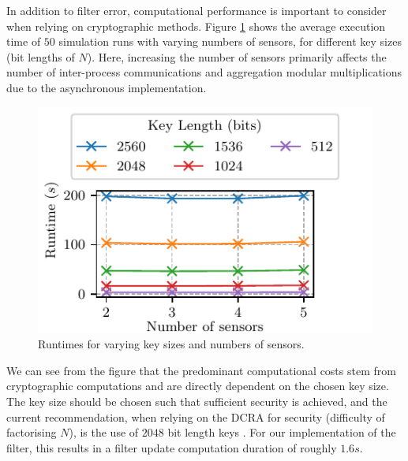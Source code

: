 \documentclass[10pt,letterpaper,oneside,twocolumn,journal]{IEEEtran}
\theoremstyle{definition}
\theoremstyle{definition}
\theoremstyle{remark}
\begin{document}
In addition to filter error, computational performance is important to consider when relying on cryptographic methods. Figure \ref{fig:sim_timing} shows the average execution time of $50$ simulation runs with varying numbers of sensors, for different key sizes (bit lengths of $N$). Here, increasing the number of sensors primarily affects the number of inter-process communications and aggregation modular multiplications due to the asynchronous implementation.
\begin{figure}[htbp]
    \centering
    \includegraphics{images/timing.pdf}
    \caption{Runtimes for varying key sizes and numbers of sensors.}
    \label{fig:sim_timing}
\end{figure}
We can see from the figure that the predominant computational costs stem from cryptographic computations and are directly dependent on the chosen key size. The key size should be chosen such that sufficient security is achieved, and the current recommendation, when relying on the DCRA for security (difficulty of factorising $N$), is the use of $2048$ bit length keys \cite{barkerRecommendationPairwiseKey2019}. For our implementation of the filter, this results in a filter update computation duration of roughly $1.6s$.

% 
%                                               
%                                               
%                                               
% 
\end{document}
